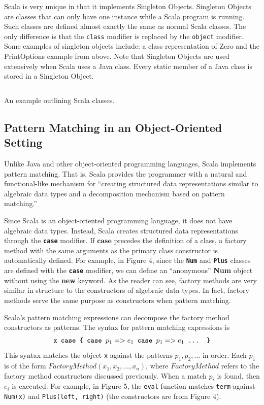 \documentclass[jou,apacite]{IEEEtran}
\begin{document}
Scala is very unique in that it implements Singleton Objects. Singleton Objects
are classes that can only have one instance while a Scala program is
running. Such classes are defined almost exactly the same as normal Scala
classes. The only difference is that the \texttt{class} modifier is replaced by
the \texttt{object} modifier. Some examples of singleton objects include: a
class representation of Zero and the PrintOptions example from above. Note that
Singleton Objects are used extensively when Scala uses a Java class. Every
static member of a Java class is stored in a Singleton Object.

\begin{listing}
  \inputminted{Scala}{../examples/Nat.scala}
  \caption{An example outlining Scala classes.}
  \label{lst:nats-example}
\end{listing}

\subsection{Pattern Matching in an Object-Oriented Setting}
Unlike Java and other object-oriented programming languages, Scala implements
pattern matching. That is, Scala provides the programmer with a natural and
functional-like mechanism for ``creating structured data representations similar
to algebraic data types and a decomposition mechanism based on pattern
matching.''

Since Scala is an object-oriented programming language, it does not have
algebraic data types. Instead, Scala creates structured data representations
through the \texttt{\textbf{case}} modifier. If $\textbf{case}$ precedes the
definition of a class, a factory method with the same arguments as the primary
class constructor is automatically defined. For example, in Figure 4, since the
\texttt{\textbf{Num}} and \texttt{\textbf{Plus}} classes are defined with the
\texttt{\textbf{case}} modifier, we can define an “anonymous” \textbf{Num}
object without using the \textbf{new} keyword. As the reader can see, factory
methods are very similar in structure to the constructors of algebraic data
types. In fact, factory methods serve the same purpose as constructors when
pattern matching.

Scala's pattern matching expressions can decompose the factory method
constructors as patterns. The syntax for pattern matching expressions is
\[                              %
    \texttt{x \textbf{case} \{ \textbf{case} $p_1 => e_1$ \textbf{case} $p_1 => e_1$ ... \}}
\]
This syntax matches the object \texttt{x} against the patterns $p_1, p_2, ...$
in order. Each $p_1$ is of the form $FactoryMethod(x_1, x_2, …, x_n)$, where
$FactoryMethod$ refers to the factory method constructors discussed
previously. When a match $p_i$ is found, then $e_i$ is executed. For example, in
Figure 5, the \texttt{eval} function matches \texttt{term} against
\texttt{Num(x)} and \texttt{Plus(left, right)} (the constructors are from Figure
4).
\end{document}
